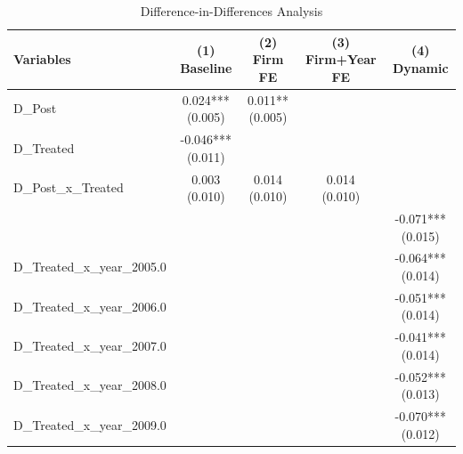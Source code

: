 \documentclass{article}
\begin{document}
\begin{table}[h!]
    \centering
    \caption{Difference-in-Differences Analysis}
    \label{table:5}
    \begin{tabular}{lcccc}
        \toprule
        Variables                   & (1) Baseline        & (2) Firm FE & (3) Firm+Year FE & (4) Dynamic         \\
        \midrule
        D\_Post                     & \makecell{0.024***                                                         \\ (0.005)}  & \makecell{0.011** \\ (0.005)} &                  &                   \\
        D\_Treated                  & \makecell{-0.046***                                                        \\ (0.011)} &                 &                  &                   \\
        D\_Post\_x\_Treated         & \makecell{0.003                                                            \\ (0.010)}     & \makecell{0.014 \\ (0.010)}   & \makecell{0.014 \\ (0.010)}    &                   \\
                                    &                     &             &                  & \makecell{-0.071*** \\ (0.015)} \\
        D\_Treated\_x\_year\_2005.0 &                     &             &                  & \makecell{-0.064*** \\ (0.014)} \\
        D\_Treated\_x\_year\_2006.0 &                     &             &                  & \makecell{-0.051*** \\ (0.014)} \\
        D\_Treated\_x\_year\_2007.0 &                     &             &                  & \makecell{-0.041*** \\ (0.014)} \\
        D\_Treated\_x\_year\_2008.0 &                     &             &                  & \makecell{-0.052*** \\ (0.013)} \\
        D\_Treated\_x\_year\_2009.0 &                     &             &                  & \makecell{-0.070*** \\ (0.012)} \\

\end{tabular}
\end{table}
\end{document}
